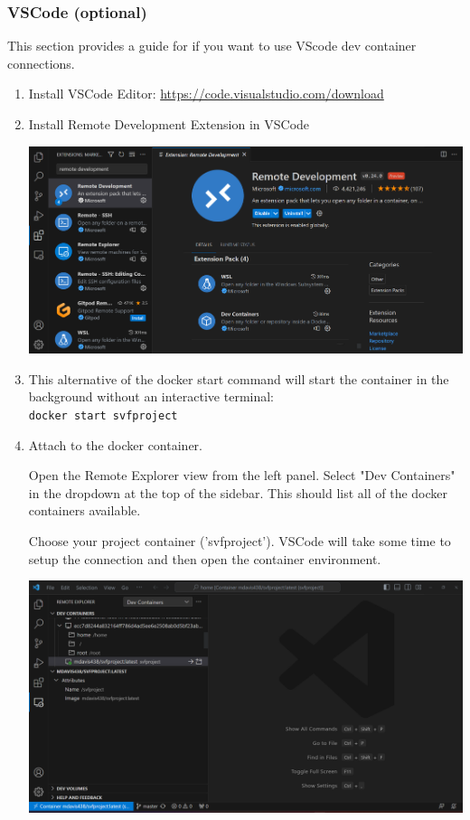 \documentclass[12pt]{article}
\newcommand{\codeIn}[1]{{\small\tt{#1}}}
\begin{document}
\filbreak
\subsubsection{VSCode (optional)}

This section provides a guide for if you want to use VScode dev container connections.

\begin{enumerate}
    \item Install VSCode Editor: \url{https://code.visualstudio.com/download}

    \item Install Remote Development Extension in VSCode

    \begin{center}
        \includegraphics[width=0.8\linewidth]{extension.png}
        \label{fig:install_docker}
    \end{center}

    \item This alternative of the docker start command will start the container in the background without an interactive terminal:\\
    \codeIn{docker start svfproject}

    \item Attach to the docker container. 
    
    Open the Remote Explorer view from the left panel. Select "Dev Containers" in the dropdown at the top of the sidebar. This should list all of the docker containers available.
    
    Choose your project container ('svfproject'). VSCode will take some time to setup the connection and then open the container environment.
    
    \begin{center}
        \includegraphics[width=0.8\linewidth]{attach.png}
        \label{fig:attach}
    \end{center}
    

\end{enumerate}
\end{document}

